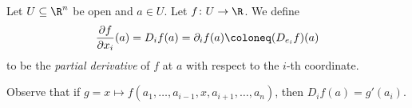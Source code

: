 \begin{definition*} \label{def:pdv}
    Let $U \subseteq \R^n$ be open and $a \in U$.
    Let $f\colon U \to \R$.
    We define \[
        \pdv{f}{x_i}(a) = D_i f(a) = \partial_i f(a) \coloneq (D_{e_i} f)(a)
    \] to be the \emph{partial derivative} of $f$ at $a$
    with respect to the $i$-th coordinate.
\end{definition*}
Observe that if $g = x \mapsto f(a_1,\dots,a_{i-1},x,a_{i+1},\dots,a_n)$,
then $D_i f(a) = g'(a_i).$
